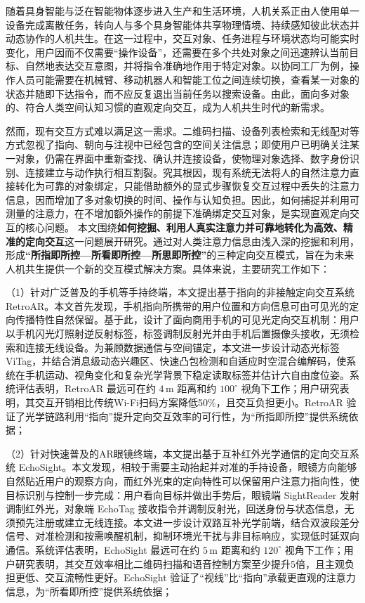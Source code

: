 \begin{cabstract}
随着具身智能与泛在智能物体逐步进入生产和生活环境，人机关系正由人使用单一设备完成离散任务，转向人与多个具身智能体共享物理情境、持续感知彼此状态并动态协作的人机共生。在这一过程中，交互对象、任务进程与环境状态均可能实时变化，用户因而不仅需要“操作设备”，还需要在多个共处对象之间迅速辨认当前目标、自然地表达交互意图，并将指令准确地作用于特定对象。以协同工厂为例，操作人员可能需要在机械臂、移动机器人和智能工位之间连续切换，查看某一对象的状态并随即下达指令，而不应反复退出当前任务以搜索设备。由此，面向多对象的、符合人类空间认知习惯的直观定向交互，成为人机共生时代的新需求。

然而，现有交互方式难以满足这一需求。二维码扫描、设备列表检索和无线配对等方式忽视了指向、朝向与注视中已经包含的空间关注信息；即使用户已明确关注某一对象，仍需在界面中重新查找、确认并连接设备，使物理对象选择、数字身份识别、连接建立与动作执行相互割裂。究其根因，现有系统无法将人的自然注意力直接转化为可靠的对象绑定，只能借助额外的显式步骤恢复交互过程中丢失的注意力信息，因而增加了多对象切换的时间、操作与认知负担。因此，如何捕捉并利用可测量的注意力，在不增加额外操作的前提下准确绑定交互对象，是实现直观定向交互的核心问题。
本文围绕\textbf{如何挖掘、利用人真实注意力并可靠地转化为高效、精准的定向交互}这一问题展开研究。通过对人类注意力信息由浅入深的挖掘和利用，形成\textbf{“所指即所控—所看即所控—所思即所控”}的三种定向交互模式，旨在为未来人机共生提供一个新的交互模式解决方案。具体来说，主要研究工作如下：

（1）针对广泛普及的手机等手持终端，本文提出基于指向的非接触定向交互系统 RetroAR。本文首先发现，手机指向所携带的用户位置和方向信息可由可见光的定向传播特性自然保留。基于此，设计了面向商用手机的可见光定向交互机制：用户以手机闪光灯照射逆反射标签，标签调制反射光并由手机后置摄像头接收，无须检索和连接无线设备。为兼顾数据通信与空间锚定，本文进一步设计动态光标签 ViTag，并结合消息级动态兴趣区、快速凸包检测和自适应时空混合编解码，使系统在手机运动、视角变化和复杂光学背景下稳定读取标签并估计六自由度位姿。系统评估表明，RetroAR 最远可在约 $4\,\mathrm{m}$ 距离和约 $100^\circ$ 视角下工作；用户研究表明，其交互开销相比传统Wi-Fi扫码方案降低50\%，且交互负担更小。RetroAR 验证了光学链路利用“指向”提升定向交互效率的可行性，为“所指即所控”提供系统依据；

（2）针对快速普及的AR眼镜终端，本文提出基于互补红外光学通信的定向交互系统 EchoSight。本文发现，相较于需要主动抬起并对准的手持设备，眼镜方向能够自然贴近用户的观察方向，而红外光束的定向特性可以保留用户注意力指向性，使目标识别与控制一步完成：用户看向目标并做出手势后，眼镜端 SightReader 发射调制红外光，对象端 EchoTag 接收指令并调制反射光，回送身份与状态信息，无须预先注册或建立无线连接。本文进一步设计双路互补光学前端，结合双波段差分信号、对准检测和按需唤醒机制，抑制环境光干扰与非目标响应，实现低时延双向通信。系统评估表明，EchoSight 最远可在约 $5\,\mathrm{m}$ 距离和约 $120^\circ$ 视角下工作；用户研究表明，其交互效率相比二维码扫描和语音控制方案至少提升5倍，且主观负担更低、交互流畅性更好。EchoSight 验证了“视线”比“指向”承载更直观的注意力信息，为“所看即所控”提供系统依据；


\end{cabstract}
